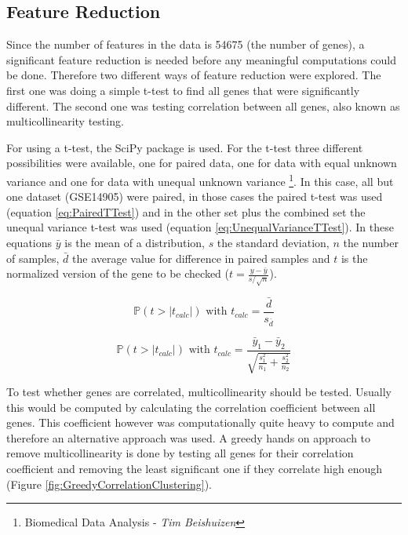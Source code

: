 \documentclass[10pt,a4paper]{article}
\begin{document}
	\subsection{Feature Reduction}
	\label{subsec:MethodsFeatureReduction}
	
	Since the number of features in the data is 54675 (the number of genes), a significant feature reduction is needed before any meaningful computations could be done. Therefore two different ways of feature reduction were explored. The first one was doing a simple t-test to find all genes that were significantly different. The second one was testing correlation between all genes, also known as multicollinearity testing.
	
	For using a t-test, the SciPy package is used. For the t-test three different possibilities were available, one for paired data, one for data with equal unknown variance and one for data with unequal unknown variance \footnote{\label{fn:BDA}Biomedical Data Analysis - \textit{Tim Beishuizen}}. In this case, all but one dataset (GSE14905) were paired, in those cases the paired t-test was used (equation \ref{eq:PairedTTest}) and in the other set plus the combined set the unequal variance t-test was used (equation \ref{eq:UnequalVarianceTTest}). In these equations $\bar{y}$ is the mean of a distribution, $s$ the standard deviation, $n$ the number of samples, $\bar{d}$ the average value for difference in paired samples and $t$ is the normalized version of the gene to be checked ($t = \frac{y - \bar{y}}{s/\sqrt{n}}$).  
	
	\begin{equation}
	\label{eq:PairedTTest}
	\mathbb{P}(t > |t_{calc}|) \text{ with } t_{calc} =\frac{\bar{d}}{s_{\bar{d}}}
	\end{equation}
	
	\begin{equation}
	\label{eq:UnequalVarianceTTest}
	\mathbb{P}(t >|t_{calc}|) \text { with } t_{calc} = \frac{\bar{y}_1 - 
		\bar{y}_2}{\sqrt{\frac{s^2_1}{n_1} + \frac{s^2_2}{n_2}}} 
	\end{equation}
	
	To test whether genes are correlated, multicollinearity should be tested. Usually this would be computed by calculating the correlation coefficient between all genes. This coefficient however was computationally quite heavy to compute and therefore an alternative approach was used. A greedy hands on approach to remove multicollinearity is done by testing all genes for their correlation coefficient and removing the least significant one if they correlate high enough (Figure \ref{fig:GreedyCorrelationClustering}).
	
\end{document}
